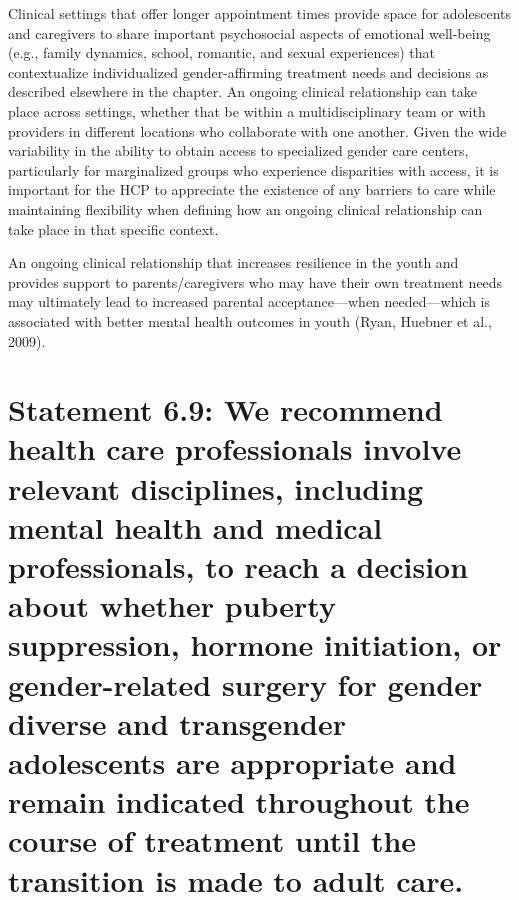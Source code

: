 \documentclass[
]{book}
\begin{document}
Clinical settings that offer longer appointment
times provide space for adolescents and caregivers
to share important psychosocial aspects of emotional well-being (e.g., family dynamics, school,
romantic, and sexual experiences) that contextualize individualized gender-affirming treatment
needs and decisions as described elsewhere in
the chapter. An ongoing clinical relationship can
take place across settings, whether that be within
a multidisciplinary team or with providers in
different locations who collaborate with one
another. Given the wide variability in the ability
to obtain access to specialized gender care centers, particularly for marginalized groups who
experience disparities with access, it is important
for the HCP to appreciate the existence of any
barriers to care while maintaining flexibility when
defining how an ongoing clinical relationship can
take place in that specific context.

An ongoing clinical relationship that increases
resilience in the youth and provides support to
parents/caregivers who may have their own treatment needs may ultimately lead to increased
parental acceptance---when needed---which is
associated with better mental health outcomes in
youth (Ryan, Huebner et al., 2009).

\hypertarget{statement-6.9-we-recommend-health-care-professionals-involve-relevant-disciplines-including-mental-health-and-medical-professionals-to-reach-a-decision-about-whether-puberty-suppression-hormone-initiation-or-gender-related-surgery-for-gender-diverse-and-transgender-adolescents-are-appropriate-and-remain-indicated-throughout-the-course-of-treatment-until-the-transition-is-made-to-adult-care.}{%
\section*{Statement 6.9: We recommend health care professionals involve relevant disciplines, including mental health and medical professionals, to reach a decision about whether puberty suppression, hormone initiation, or gender-related surgery for gender diverse and transgender adolescents are appropriate and remain indicated throughout the course of treatment until the transition is made to adult care.}\label{statement-6.9-we-recommend-health-care-professionals-involve-relevant-disciplines-including-mental-health-and-medical-professionals-to-reach-a-decision-about-whether-puberty-suppression-hormone-initiation-or-gender-related-surgery-for-gender-diverse-and-transgender-adolescents-are-appropriate-and-remain-indicated-throughout-the-course-of-treatment-until-the-transition-is-made-to-adult-care.}}
\end{document}
